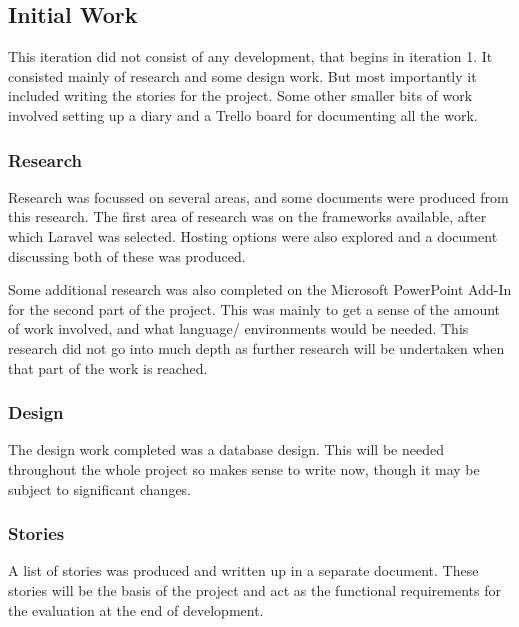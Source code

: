 \subsection{Initial Work}
This iteration did not consist of any development, that begins in iteration 1. It consisted mainly of research and some design work. But most importantly it included writing the stories for the project. Some other smaller bits of work involved setting up a diary and a Trello board for documenting all the work.
\subsubsection{Research}
Research was focussed on several areas, and some documents were produced from this research. The first area of research was on the frameworks available, after which Laravel was selected. Hosting options were also explored and a document discussing both of these was produced.

Some additional research was also completed on the Microsoft PowerPoint Add-In for the second part of the project. This was mainly to get a sense of the amount of work involved, and what language/ environments would be needed. This research did not go into much depth as further research will be undertaken when that part of the work is reached.
\subsubsection{Design}
The design work completed was a database design. This will be needed throughout the whole project so makes sense to write now, though it may be subject to significant changes.
\subsubsection{Stories}
A list of stories was produced and written up in a separate document. These stories will be the basis of the project and act as the functional requirements for the evaluation at the end of development.
\newpage